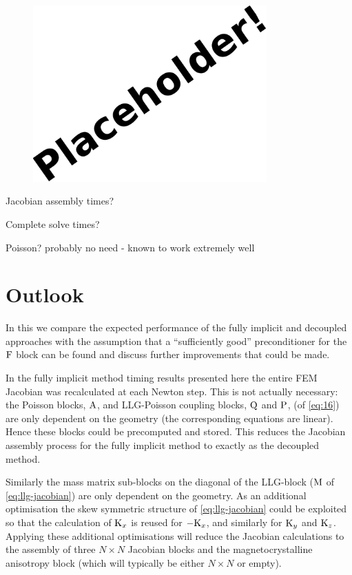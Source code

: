 \begin{figure}
  \centering
  \includegraphics[width=0.8\textwidth]{images/placeholder}
  \caption{}
  \label{fig:times-semi-vs-fully-implicit}
\end{figure}


Jacobian assembly times?

Complete solve times?

Poisson? probably no need - known to work extremely well



\section{Outlook}
\label{sec:furth-optim-opport}

In this  we compare the expected performance of the fully implicit and decoupled approaches with the assumption that a ``sufficiently good'' preconditioner for the $\mathrm{F}$ block can be found and discuss further improvements that could be made.

In the fully implicit method timing results presented here the entire FEM Jacobian was recalculated at each Newton step.
This is not actually necessary: the Poisson blocks, $\mathrm{A}$, and LLG-Poisson coupling blocks, $\mathrm{Q}$ and $\mathrm{P}$, (of \cref{eq:16}) are only dependent on the geometry (\ie the corresponding equations are linear).
Hence these blocks could be precomputed and stored.
This reduces the Jacobian assembly process for the fully implicit method to exactly as the decoupled method.

Similarly the mass matrix sub-blocks on the diagonal of the LLG-block ($\mathrm{M}$ of \cref{eq:llg-jacobian}) are only dependent on the geometry.
As an additional optimisation the skew symmetric structure of \cref{eq:llg-jacobian} could be exploited so that the calculation of $\mathrm{K}_x$ is reused for $-\mathrm{K}_x$, and similarly for $\mathrm{K}_y$ and $\mathrm{K}_z$.
Applying these additional optimisations will reduce the Jacobian calculations to the assembly of three $N \times N$ Jacobian blocks and the magnetocrystalline anisotropy block (which will typically be either $N \times N$ or empty).



